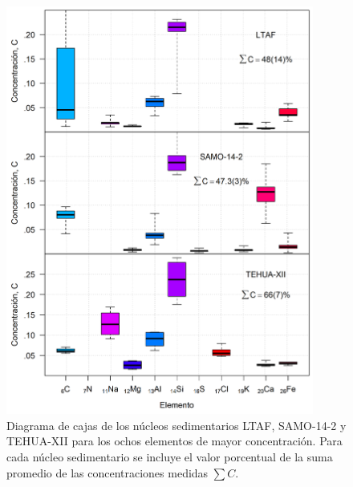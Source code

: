 \begin{figure}
\centering
\includegraphics[width=0.9\textwidth]{Imagenes/XRF_Todos_Los_Nucleos_2.png}
\caption{Diagrama de cajas de los núcleos sedimentarios LTAF, SAMO-14-2 y TEHUA-XII para los ochos elementos de mayor concentración.  Para cada núcleo sedimentario se incluye el valor porcentual de la suma promedio de las concentraciones medidas $\sum C$.}\label{Fig-ConcentracionNucleos2}
\end{figure}
\newpage
